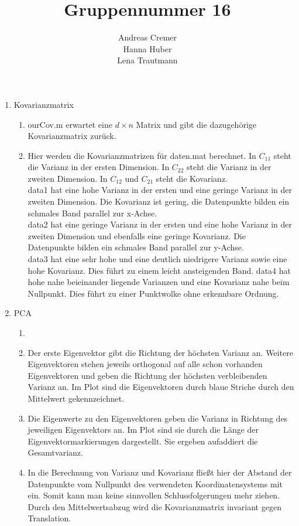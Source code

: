 \documentclass[]{report}
\title{Gruppennummer 16}
\author{Andreas Cremer\\Hanna Huber\\Lena Trautmann}
\begin{document}
\maketitle


\begin{enumerate}
	\item Kovarianzmatrix
	\begin{enumerate}
		\item
		ourCov.m erwartet eine $d \times n$ Matrix und gibt die dazugehörige Kovarianzmatrix zurück.
		\item
		Hier werden die Kovarianzmatrizen für daten.mat berechnet. In $C_{11}$ steht die Varianz in der ersten Dimension. In $C_{22}$ steht die Varianz in der zweiten Dimension. In $C_{12}$ und $C_{21}$ steht die Kovarianz.\\
		data1 hat eine hohe Varianz in der ersten und eine geringe Varianz in der zweiten Dimension. Die Kovarianz ist gering, die Datenpunkte bilden ein schmales Band parallel zur x-Achse.\\
		data2 hat eine geringe Varianz in der ersten und eine hohe Varianz in der zweiten Dimension und ebenfalls eine geringe Kovarianz. Die Datenpunkte bilden ein schmales Band parallel zur y-Achse.\\
		data3 hat eine sehr hohe und eine deutlich niedrigere Varianz sowie eine hohe Kovarianz. Dies führt zu einem leicht ansteigenden Band.
		data4 hat hohe nahe beieinander liegende Varianzen und eine Kovarianz nahe beim Nullpunkt. Dies führt zu einer Punktwolke ohne erkennbare Ordnung.
	\end{enumerate}
	\item PCA
	\begin{enumerate}
		
		\item
		\item
		Der erste Eigenvektor gibt die Richtung der höchsten Varianz an. Weitere Eigenvektoren stehen jeweils orthogonal auf alle schon vorhanden Eigenvektoren und geben die Richtung der höchsten verbleibenden Varianz an. Im Plot sind die Eigenvektoren durch blaue Striche durch den Mittelwert gekennzeichnet.
		\item
		Die Eigenwerte zu den Eigenvektoren geben die Varianz in Richtung des jeweiligen Eigenvektors an. Im Plot sind sie durch die Länge der Eigenvektormarkierungen dargestellt. Sie ergeben aufaddiert die Gesamtvarianz.
		\item
		In die Berechnung von Varianz und Kovarianz fließt hier der Abstand der Datenpunkte vom Nullpunkt des verwendeten Koordinatensystems mit ein. Somit kann man keine sinnvollen Schlussfolgerungen mehr ziehen. Durch den Mittelwertsabzug wird die Kovarianzmatrix invariant gegen Translation. 
		

\end{enumerate}
\end{enumerate}
\end{document}
